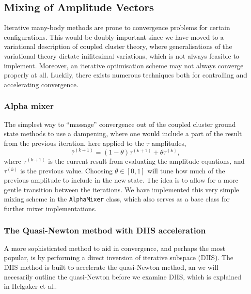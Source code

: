 \subsection{Mixing of Amplitude Vectors}

    Iterative many-body methods are prone to convergence problems for certain configurations.
    This would be doubly important since we have moved to a variational description 
    of coupled cluster theory,
    where generalisations of the variational theory dictate inifitesimal variations, which 
    is not always feasible to implement.
    Moreover, an iterative optimisation scheme may not always converge properly at all. 
    Luckily, there exists numerous techniques both for controlling and accelerating 
    convergence.

    \subsubsection{Alpha mixer}

    The simplest way to ``massage'' convergence out of the coupled cluster ground state methods
    to use a dampening, where one would include a part of the result from the previous 
    iteration, here applied to the $\tau$ amplitudes,
    \begin{equation}
        \bar{\tau}^{(k+1)} = (1 - \theta)\tau^{(k+1)} + \theta\tau^{(k)},
    \end{equation}
    where $\tau^{(k+1)}$ is the current result from evaluating the amplitude equations, 
    and $\tau^{(k)}$ is the previous value. Choosing $\theta \in [0,1]$ will tune how
    much of the previous amplitude to include in the new state. The idea is to allow for 
    a more gentle transition between the iterations. We have implemented this 
    very simple mixing scheme in the \lstinline{AlphaMixer} class, which also serves as 
    a base class for further mixer implementations.

    


    \subsubsection{The Quasi-Newton method with DIIS acceleration}

    A more sophisticated method to aid in convergence, and perhaps the most popular,
    is by performing a direct inversion of iterative subspace (DIIS). The DIIS method 
    is built to accelerate the quasi-Newton method, an we will necesarily outline the 
    quasi-Newton before we examine DIIS, which is explained in Helgaker et 
    al.\cite{helgaker2014molecular}.

